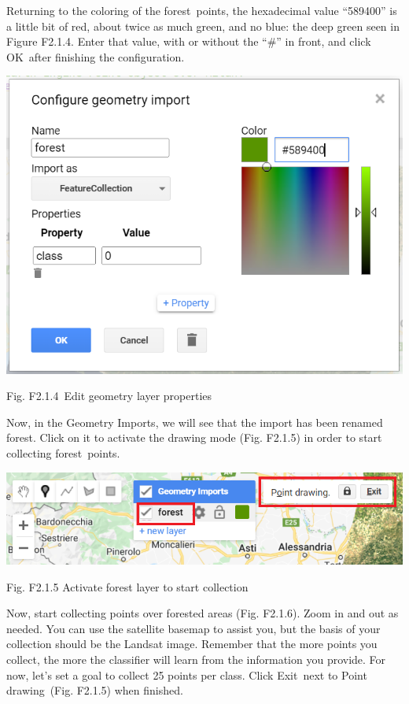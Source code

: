 \documentclass[
  letterpaper,
  DIV=11,
  numbers=noendperiod]{scrreprt}
\begin{document}
Returning to the coloring of the forest~points, the hexadecimal value
``589400'' is a little bit of red, about twice as much green, and no
blue: the deep green seen in Figure F2.1.4. Enter that value, with or
without the ``\#'' in front, and click OK~after finishing the
configuration.

\includegraphics{./F2/image36.png}

Fig. F2.1.4~Edit geometry layer properties

Now, in the Geometry Imports, we will see that the import has been
renamed forest. Click on it to activate the drawing mode (Fig. F2.1.5)
in order to start collecting forest~points.

\includegraphics{./F2/image29.png}

Fig. F2.1.5 Activate forest layer to start collection

Now, start collecting points over forested areas (Fig. F2.1.6). Zoom in
and out as needed. You can use the satellite basemap to assist you, but
the basis of your collection should be the Landsat image. Remember that
the more points you collect, the more the classifier will learn from the
information you provide. For now, let's set a goal to collect 25 points
per class. Click Exit~next to Point drawing~(Fig. F2.1.5) when finished.
\end{document}

